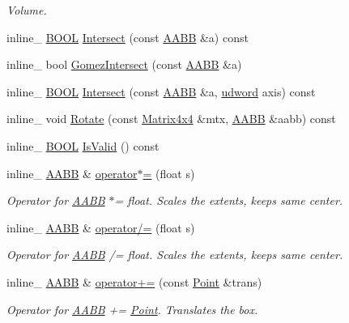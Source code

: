 \begin{DoxyCompactItemize}
\begin{DoxyCompactList}\small\item\em Volume. \end{DoxyCompactList}\item 
inline\+\_\+ \hyperlink{IceTypes_8h_a050c65e107f0c828f856a231f4b4e788}{B\+O\+OL} \hyperlink{classAABB_a4e1faf2a1bc32174c468dd49ac5452b3}{Intersect} (const \hyperlink{classAABB}{A\+A\+BB} \&a) const 
\item 
inline\+\_\+ bool \hyperlink{classAABB_a277bc0c18b7561ebee24739ecad805b5}{Gomez\+Intersect} (const \hyperlink{classAABB}{A\+A\+BB} \&a)
\item 
inline\+\_\+ \hyperlink{IceTypes_8h_a050c65e107f0c828f856a231f4b4e788}{B\+O\+OL} \hyperlink{classAABB_a18b9b090a4a5cbdbd7c809347df2ff03}{Intersect} (const \hyperlink{classAABB}{A\+A\+BB} \&a, \hyperlink{IceTypes_8h_a44c6f1920ba5551225fb534f9d1a1733}{udword} axis) const 
\item 
inline\+\_\+ void \hyperlink{classAABB_ad4f1de1a5d1a4ff71bcc8a47f7e8ca11}{Rotate} (const \hyperlink{classMatrix4x4}{Matrix4x4} \&mtx, \hyperlink{classAABB}{A\+A\+BB} \&aabb) const 
\item 
inline\+\_\+ \hyperlink{IceTypes_8h_a050c65e107f0c828f856a231f4b4e788}{B\+O\+OL} \hyperlink{classAABB_aef83f74a817f5ad98693b40c16548f4c}{Is\+Valid} () const 
\item 
inline\+\_\+ \hyperlink{classAABB}{A\+A\+BB} \& \hyperlink{classAABB_a7af8c6a1926fa0914d4ccc563399affb}{operator$\ast$=} (float s)\hypertarget{classAABB_a7af8c6a1926fa0914d4ccc563399affb}{}\label{classAABB_a7af8c6a1926fa0914d4ccc563399affb}

\begin{DoxyCompactList}\small\item\em Operator for \hyperlink{classAABB}{A\+A\+BB} $\ast$= float. Scales the extents, keeps same center. \end{DoxyCompactList}\item 
inline\+\_\+ \hyperlink{classAABB}{A\+A\+BB} \& \hyperlink{classAABB_a10378a1b9a6540384a6112128cdd5972}{operator/=} (float s)\hypertarget{classAABB_a10378a1b9a6540384a6112128cdd5972}{}\label{classAABB_a10378a1b9a6540384a6112128cdd5972}

\begin{DoxyCompactList}\small\item\em Operator for \hyperlink{classAABB}{A\+A\+BB} /= float. Scales the extents, keeps same center. \end{DoxyCompactList}\item 
inline\+\_\+ \hyperlink{classAABB}{A\+A\+BB} \& \hyperlink{classAABB_a1aa2bcb5279bd03fc4b9e074e1249fec}{operator+=} (const \hyperlink{classPoint}{Point} \&trans)\hypertarget{classAABB_a1aa2bcb5279bd03fc4b9e074e1249fec}{}\label{classAABB_a1aa2bcb5279bd03fc4b9e074e1249fec}

\begin{DoxyCompactList}\small\item\em Operator for \hyperlink{classAABB}{A\+A\+BB} += \hyperlink{classPoint}{Point}. Translates the box. \end{DoxyCompactList}\end{DoxyCompactItemize}

